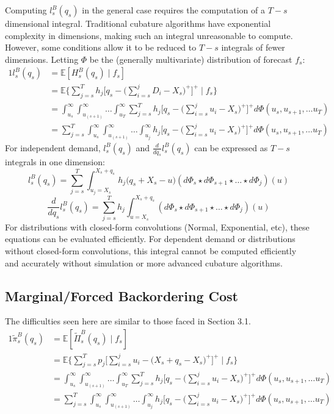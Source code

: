 \documentclass[12pt]{article}
\newcommand{\EX}{\mathbb{E}}
\begin{document}
Computing $l_s^B(q_s)$ in the general case requires the computation of a $T - s$ dimensional integral. Traditional cubature algorithms have exponential complexity in dimensions, making such an integral unreasonable to compute. However, some conditions allow it to be reduced to $T-s$ integrals of fewer dimensions. Letting $\Phi$ be the (generally multivariate) distribution of forecast $f_s$: 
\begin{alignat*}{1}
	l_s^B(q_s) &= \EX [H_s^B(q_s) \; | \; f_s] \\
        &= \EX \bigg\{\sum_{j=s}^T h_j\bigg[q_s - \bigg(\sum_{i=s}^j D_i - X_s\bigg)^+\bigg]^+  \; | \; f_s \bigg\} \\
		&= \int_{u_s}^{\infty} \int_{u_{(s+1)}}^{\infty}\dots \int_{u_T}^{\infty}\sum_{j=s}^T h_j\bigg[q_s - \bigg(\sum_{i=s}^j u_i - X_s\bigg)^+\bigg]^+ d\Phi(u_s, u_{s+1}, \dots u_T)\\
	   &= \sum_{j=s}^T \int_{u_s}^{\infty} \int_{u_{(s+1)}}^{\infty}\dots \int_{u_j}^{\infty} h_j\bigg[q_s - \bigg(\sum_{i=s}^j u_i - X_s\bigg)^+\bigg]^+ d\Phi(u_s, u_{s+1}, \dots u_T)
\end{alignat*}
For independent demand, $l_s^B(q_s)$ and $\frac{d}{d q_s} l_s^B(q_s)$ can be expressed as $T - s$ integrals in one dimension:
\begin{equation}
	l_s^B(q_s) = \sum_{j=s}^T \int_{u_j=X_s}^{X_s + q_s} h_j\bigg(q_s + X_s - u \bigg) (d\Phi_s \star d\Phi_{s+1} \star \dots \star d\Phi_j)(u)
\end{equation}
\begin{equation}
	\frac{d}{d q_s} l_s^B(q_s) =  \sum_{j=s}^T h_j \int_{u =X_s}^{X_s + q_s}  (d\Phi_s \star d\Phi_{s+1} \star \dots \star d\Phi_j)(u)
\end{equation}
For distributions with closed-form convolutions (Normal, Exponential, etc), these equations can be evaluated efficiently. For dependent demand or distributions without closed-form convolutions, this integral cannot be computed efficiently and accurately without simulation or more advanced cubature algorithms. 

\subsection{Marginal/Forced Backordering Cost}

The difficulties seen here are similar to those faced in Section 3.1. 
\begin{alignat*}{1}
	\tilde{\pi}_s^B(q_s) &= \EX [\tilde{\Pi}_s^B(q_s) \; | \; f_s] \\
        &= \EX \bigg\{\sum_{j=s}^T p_j\bigg[\sum_{i=s}^j u_i - \bigg(X_s + q_s- X_s\bigg)^+\bigg]^+  \; | \; f_s \bigg\} \\
		&= \int_{u_s}^{\infty} \int_{u_{(s+1)}}^{\infty}\dots \int_{u_T}^{\infty}\sum_{j=s}^T h_j\bigg[q_s - \bigg(\sum_{i=s}^j u_i - X_s\bigg)^+\bigg]^+ d\Phi(u_s, u_{s+1}, \dots u_T)\\
	   &= \sum_{j=s}^T \int_{u_s}^{\infty} \int_{u_{(s+1)}}^{\infty}\dots \int_{u_j}^{\infty} h_j\bigg[q_s - \bigg(\sum_{i=s}^j u_i - X_s\bigg)^+\bigg]^+ d\Phi(u_s, u_{s+1}, \dots u_T)
\end{alignat*}
\end{document}
